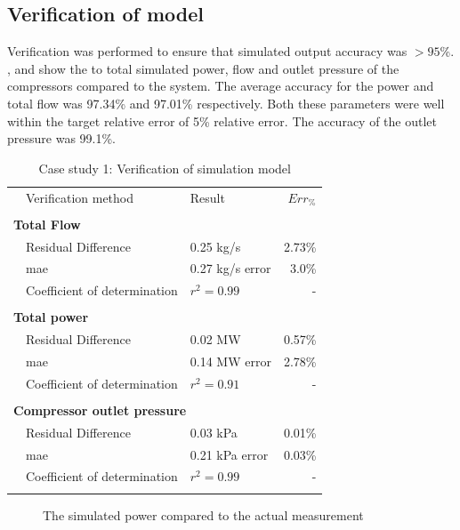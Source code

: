 \subsection{Verification of model}
Verification was performed to ensure that simulated output accuracy was $>95$\%. ,  and  show the to total simulated power, flow and outlet pressure of the compressors compared to the system. The average accuracy for the power and total flow was 97.34\% and 97.01\% respectively. Both these parameters were well within the target relative error of 5\% relative error. The accuracy of the outlet pressure was 99.1\%. 

 \begin{table}[h!]
	\label{Beet verification table}
	\centering
	\begin{tabular}{p{0.5cm}p{8cm}p{5cm}r}
		\hline
		&Verification method & Result & $Err_{\%}$\\
		\hhline{====}
		\\ \multicolumn{4}{l}{\textbf{ Total Flow}}\\
		&Residual Difference  & 0.25 kg/s & 2.73\% \\
		&\gls{mae} 					 & 0.27 kg/s error & 3.0\% \\
		&Coefficient of determination & $r^2 =0.99$ & -\\ 
		\\ \multicolumn{4}{l}{\textbf{ Total power}}\\
		&Residual Difference  & 0.02 MW & 0.57\% \\
		&\gls{mae} 					 & 0.14 MW error & 2.78\% \\
		 &Coefficient of determination & $r^2 =0.91$ & -\\ 
		\\ \multicolumn{4}{l}{\textbf{ Compressor outlet pressure}}\\
		&Residual Difference  &0.03 kPa & 0.01\% \\
		&\gls{mae} 					 & 0.21 kPa error & 0.03\% \\
		&Coefficient of determination & $r^2 =0.99$ & -\\
	\\ 	\hline
	\end{tabular} 
	\caption{Case study 1: Verification of simulation model}
\end{table}
\begin{figure}[h!]
	\centering
	
	\caption{The simulated power compared to the actual measurement}
	\label{fig: Verification power Beatrix}
\end{figure}
